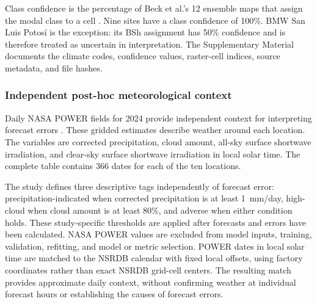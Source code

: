 Class confidence is the percentage of Beck et al.'s 12 ensemble maps that
assign the modal class to a cell \cite{beck2018}.
Nine sites have a class confidence of 100\%. BMW San Luis Potos\'i is the
exception: its BSh assignment has 50\% confidence and is therefore treated as
uncertain in interpretation. The Supplementary Material documents the climate codes,
confidence values, raster-cell indices, source metadata, and file hashes.

\subsubsection{Independent post-hoc meteorological context}

Daily NASA POWER fields for 2024 provide independent context for interpreting
forecast errors \cite{nasapowerdaily}. These gridded estimates describe
weather around each location. The variables are
corrected precipitation, cloud amount, all-sky surface shortwave irradiation,
and clear-sky surface shortwave irradiation in local solar time. The complete
table contains 366 dates for each of the ten locations.

The study defines three descriptive tags independently of forecast error:
precipitation-indicated when corrected precipitation is at least 1~mm/day,
high-cloud when cloud amount is at least 80\%, and adverse when either
condition holds. These study-specific thresholds are applied after forecasts
and errors have been calculated. NASA POWER values are excluded from model
inputs, training, validation, refitting, and model or metric selection.
POWER dates in local solar time are matched to the NSRDB calendar with fixed
local offsets, using factory coordinates rather than exact NSRDB grid-cell
centers. The resulting match provides approximate daily context, without
confirming weather at individual forecast hours or establishing the causes
of forecast errors.
